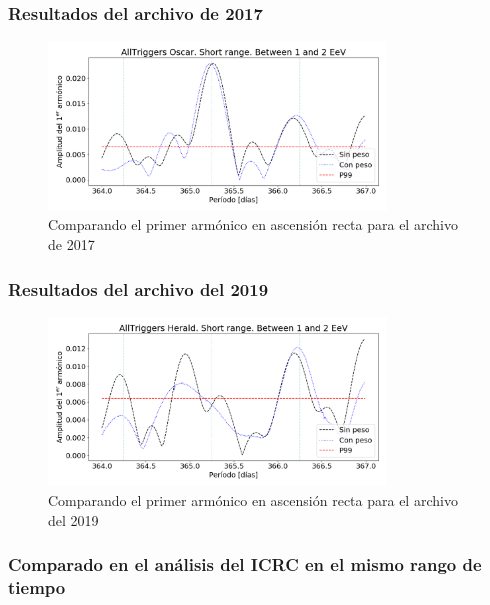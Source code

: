 			\subsubsection{Resultados del archivo de 2017}

					\begin{figure}[H]
						\centering
						\includegraphics[width=0.8\textwidth]{../Anisotropia/AllTriggers/AllTriggers_2017_Short_range_Between_1_2_EeV.png}
						\caption{Comparando el primer armónico en ascensión recta para el archivo de 2017}
					\end{figure}

			\subsubsection{Resultados del archivo del 2019}

					\begin{figure}[H]
						\centering
						\includegraphics[width=0.8\textwidth]{../Anisotropia/AllTriggers/AllTriggers_2019_Short_range_Between_1_2_EeV.png}
						\caption{Comparando el primer armónico en ascensión recta para el archivo del 2019}
					\end{figure}

			\subsubsection{Comparado en el análisis del ICRC en el mismo rango de tiempo}

